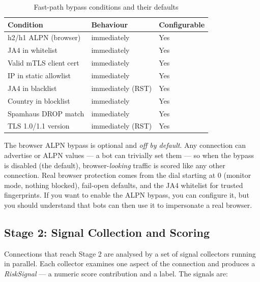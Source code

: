 \begin{table}[ht]
  \small
  \begin{tabularx}{\linewidth}{lXl}
    \toprule
    \textbf{Condition} & \textbf{Behaviour} & \textbf{Configurable} \\
    \midrule
    h2/h1 ALPN (browser) & \badgeallow{} immediately & Yes \\
    JA4 in whitelist & \badgeallow{} immediately & Yes \\
    Valid mTLS client cert & \badgeallow{} immediately & Yes \\
    IP in static allowlist & \badgeallow{} immediately & Yes \\
    \midrule
    JA4 in blacklist & \badgeblock{} immediately (RST) & Yes \\
    Country in blocklist & \badgeblock{} immediately & Yes \\
    Spamhaus DROP match & \badgeblock{} immediately & Yes \\
    TLS 1.0/1.1 version & \badgeblock{} immediately (RST) & Yes \\
    \bottomrule
  \end{tabularx}
  \caption{Fast-path bypass conditions and their defaults}
\end{table}

The browser ALPN bypass is optional and \emph{off by default}. Any connection can
advertise  or  ALPN values — a bot can trivially set them — so
when the bypass is disabled (the default), browser-\emph{looking} traffic is scored
like any other connection. Real browser protection comes from the dial starting at
0 (monitor mode, nothing blocked), fail-open defaults, and the JA4 whitelist for
trusted fingerprints. If you want to enable the ALPN bypass, you can configure it,
but you should understand that bots can then use it to impersonate a real browser.

\subsection{Stage 2: Signal Collection and Scoring}

Connections that reach Stage 2 are analysed by a set of signal collectors running
in parallel. Each collector examines one aspect of the connection and produces a
\emph{RiskSignal} — a numeric score contribution and a label. The signals are:


